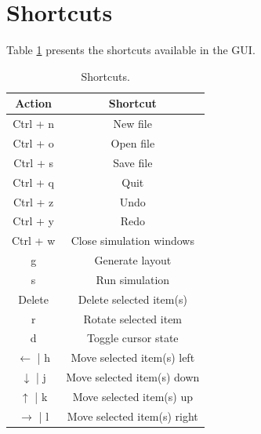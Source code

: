 \section{Shortcuts}
Table \ref{tb:shortcuts} presents the shortcuts available in the GUI.

\begin{table}
\begin{center}
\begin{singlespace}
\begin{tabular}{| c | c |}
\hline
Action & Shortcut \\
\hline
\hline
Ctrl + n & New file \\
Ctrl + o & Open file \\
Ctrl + s & Save file \\
Ctrl + q & Quit \\
Ctrl + z & Undo \\
Ctrl + y & Redo \\
Ctrl + w & Close simulation windows \\
g & Generate layout \\
s & Run simulation \\
Delete & Delete selected item(s) \\
r & Rotate selected item \\
d & Toggle cursor state \\
$\leftarrow$ | h & Move selected item(s) left \\
$\downarrow$ | j & Move selected item(s) down \\
$\uparrow$ | k & Move selected item(s) up \\
$\rightarrow$ | l & Move selected item(s) right \\
\hline
\end{tabular}
\end{singlespace}
\end{center}
\label{tb:shortcuts}
\caption[GUI shortcuts]{Shortcuts.}
\end{table}
